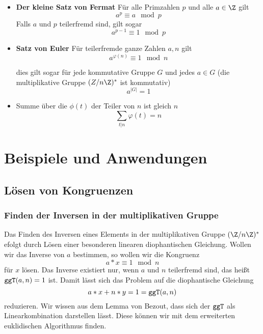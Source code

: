 \begin{itemize}
	\item \textbf{Der kleine Satz von Fermat} Für alle Primzahlen $p$ und alle $a\in\Z$ gilt
	\begin{equation*}
		a^p\equiv a\mod p
	\end{equation*}
	Falls $a$ und $p$ teilerfremd sind, gilt sogar
	\begin{equation*}
		a^{p-1}\equiv 1\mod p
	\end{equation*}

	\item \textbf{Satz von Euler} Für teilerfremde ganze Zahlen $a,n$ gilt
	\begin{equation*}
		a^{\varphi(n)}\equiv 1 \mod n
	\end{equation*}

	dies gilt sogar für jede kommutative Gruppe $G$ und jedes $a\in G$ (die multiplikative Gruppe $(Z/n\Z)^\ast$ ist kommutativ)
	\begin{equation*}
	 	a^{|G|}=1
	\end{equation*} 

	\item Summe über die $\phi(t)$ der Teiler von $n$ ist gleich $n$
	\begin{equation*}
		\sum_{t|n}\varphi(t)=n
	\end{equation*}
\end{itemize}


\section{Beispiele und Anwendungen}
\subsection{Lösen von Kongruenzen}
\subsubsection{Finden der Inversen in der multiplikativen Gruppe}
Das Finden des Inversen eines Elements in der multiplikativen Gruppe $(\Z/n\Z)^\ast$ efolgt durch Lösen einer besonderen linearen diophantischen Gleichung. Wollen wir das Inverse von $a$ bestimmen, so wollen wir die Kongruenz
\begin{equation*}
	a*x\equiv 1 \mod n
\end{equation*}
für $x$ lösen. Das Inverse existiert nur, wenn $a$ und $n$ teilerfremd sind, das heißt $\texttt{ggT}(a,n)=1$ ist. Damit lässt sich das Problem auf die diophantische Gleichung
\begin{equation*}
	a*x+n*y = 1 = \texttt{ggT}(a,n)
\end{equation*}
reduzieren. Wir wissen aus dem Lemma von Bezout, dass sich der $\texttt{ggT}$ als Linearkombination darstellen lässt. Diese können wir mit dem erweiterten euklidischen Algorithmus finden.
